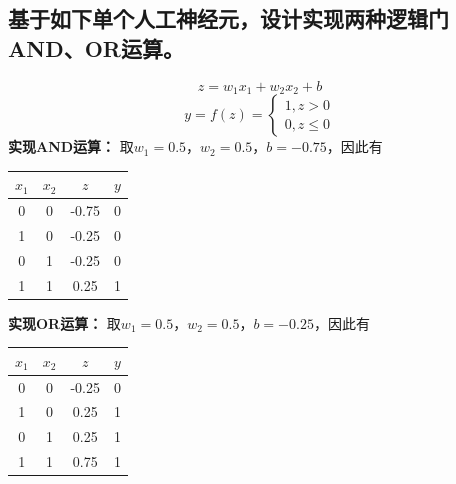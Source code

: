 \documentclass[UTF8, a4paper]{article}
\begin{document}
\subsection{基于如下单个人工神经元，设计实现两种逻辑门AND、OR运算。}
\begin{equation}
    z=w_1x_1 +w_2x_2 + b
\end{equation}
\begin{equation}
y=f(z)=\left\{
        \begin{array}{lr}
        1, z > 0 \\
        0, z \leq 0
        \end{array}
\right.
\end{equation}
\textbf{实现AND运算：}
取$ w_1=0.5 $，$ w_2=0.5 $，$ b=-0.75 $，因此有
\begin{center}
    \begin{tabular}{| c | c | c | c |}
        \hline
        $ x_1 $ & $ x_2 $ & $ z $ & $ y $ \\
        \hline
        0 & 0 & -0.75 & 0 \\
        1 & 0 & -0.25 & 0 \\
        0 & 1 & -0.25 & 0 \\
        1 & 1 & 0.25 & 1 \\
        \hline
    \end{tabular}
\end{center}
\textbf{实现OR运算：}
取$ w_1=0.5 $，$ w_2=0.5 $，$ b=-0.25 $，因此有
\begin{center}
    \begin{tabular}{| c | c | c | c |}
        \hline
        $ x_1 $ & $ x_2 $ & $ z $ & $ y $ \\
        \hline
        0 & 0 & -0.25 & 0 \\
        1 & 0 & 0.25 & 1 \\
        0 & 1 & 0.25 & 1 \\
        1 & 1 & 0.75 & 1 \\
        \hline
    \end{tabular}
\end{center}
\end{document}
